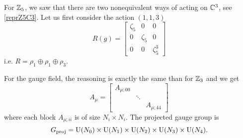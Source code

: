             For $\mathbb{Z}_5$, we saw that there are two nonequivalent ways of acting on $\mathbb{C}^3$, see \eqref{reprZ5C3}. Let us first consider the action $(1,1,3)$
            \begin{equation}
                R(g)=
                \begin{bmatrix}
                    \zeta_5 & 0 & 0\\
                    0 & \zeta_5 & 0\\
                    0 & 0 & \zeta^3_5
                \end{bmatrix}
            \end{equation}
            i.e. $R=\rho_1\oplus\rho_1\oplus\rho_3$.

            For the gauge field, the reasoning is exactly the same than for $\mathbb{Z}_3$ and we get
            \begin{equation}
                A_\mu=
                \begin{bmatrix}
                    A_{\mu;00} & & \\
                    & \ddots & \\
                    & & A_{\mu;44}
                \end{bmatrix}
            \end{equation}
            where each block $A_{\mu;ii}$ is of size $N_i\times N_i$. The projected gauge group is
            \begin{equation}
                G_{\text{proj}} = \text{U}(N_0)\times\text{U}(N_1)\times\text{U}(N_2)\times\text{U}(N_3)\times\text{U}(N_4).
            \end{equation}

